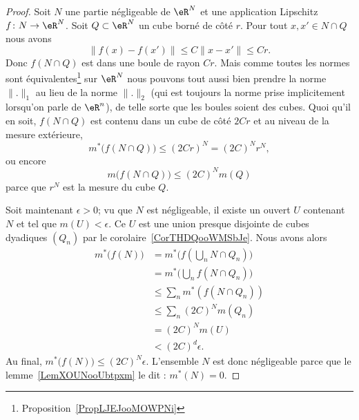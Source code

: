 \begin{proof}
	Soit \( N\) une partie négligeable de \( \eR^N\) et une application Lipschitz \( f\colon N\to \eR^N\). Soit \( Q\subset \eR^N\) un cube borné de côté \( r\). Pour tout \( x,x'\in N\cap Q\) nous avons
	\begin{equation}
		\| f(x)-f(x') \|\leq C\| x-x' \|\leq Cr.
	\end{equation}
	Donc \( f(N\cap Q)\) est dans une boule de rayon \( Cr\). Mais comme toutes les normes sont équivalentes\footnote{Proposition~\ref{PropLJEJooMOWPNi}} sur \( \eR^N\) nous pouvons tout aussi bien prendre la norme \( \| . \|_1\) au lieu de la norme \( \| . \|_2\) (qui est toujours la norme prise implicitement lorsqu'on parle de \( \eR^n\)), de telle sorte que les boules soient des cubes. Quoi qu'il en soit, \( f(N\cap Q)\) est contenu dans un cube de côté \( 2Cr\) et au niveau de la mesure extérieure,
	\begin{equation}
		m^*\big( f(N\cap Q) \big)\leq (2Cr)^N=(2C)^Nr^N,
	\end{equation}
	ou encore
	\begin{equation}
		m\big(f(N\cap Q)\big)\leq (2C)^Nm(Q)
	\end{equation}
	parce que \( r^N\) est la mesure du cube \( Q\).

	Soit maintenant \( \epsilon>0\); vu que \( N\) est négligeable, il existe un ouvert \( U\) contenant \( N\) et tel que \( m(U)<\epsilon\). Ce \( U\) est une union presque disjointe de cubes dyadiques \( (Q_n)\) par le corolaire~\ref{CorTHDQooWMSbJe}. Nous avons alors
	\begin{subequations}
		\begin{align}
			m^*\big( f(N) \big) & =m^*\big( f(\bigcup_nN\cap Q_n) \big) \\
			                    & =m^*\big( \bigcup_nf(N\cap Q_n) \big) \\
			                    & \leq \sum_nm^*(f(N\cap Q_n))          \\
			                    & \leq \sum_n(2C)^Nm(Q_n)               \\
			                    & =(2C)^Nm(U)                           \\
			                    & <(2C)^d\epsilon.
		\end{align}
	\end{subequations}
	Au final, \( m^*\big( f(N) \big)\leq (2C)^N\epsilon\).  L'ensemble \( N\) est donc négligeable parce que le lemme~\ref{LemXOUNooUbtpxm} le dit : \( m^*(N)=0\).
\end{proof}

